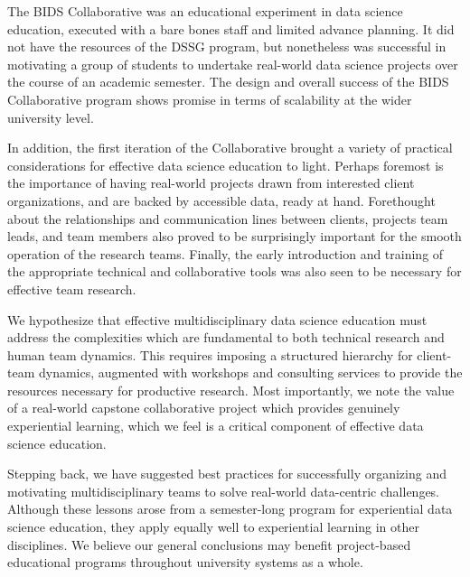 \documentclass[12pt]{article}
\begin{document}
The BIDS Collaborative was an educational experiment in data science education, executed with a bare bones staff and limited advance planning. It did not have the resources of the DSSG program, but nonetheless was successful in motivating a group of students to undertake real-world data science projects over the course of an academic semester.  The design and overall success of the BIDS Collaborative program shows promise in terms of scalability at the wider university level.

In addition, the first iteration of the Collaborative brought a variety of practical considerations for effective data science education to light.  Perhaps foremost is the importance of having real-world projects drawn from interested client organizations, and are backed by accessible data, ready at hand.  Forethought about the relationships and communication lines between clients, projects team leads, and team members also proved to be surprisingly important for the smooth operation of the research teams.  Finally, the early introduction and training of the appropriate technical and collaborative tools was also seen to be necessary for effective team research.

We hypothesize that effective multidisciplinary data science education must address the complexities which are fundamental to both technical research and human team dynamics. This requires imposing a structured hierarchy for client-team dynamics, augmented with workshops and consulting services to provide the resources necessary for productive research.  Most importantly, we note the value of a real-world capstone collaborative project which provides genuinely experiential learning, which we feel is a critical component of effective data science education.

Stepping back, we have suggested best practices for successfully organizing and motivating multidisciplinary teams to solve real-world data-centric challenges.  Although these lessons arose from a semester-long program for experiential data science education, they apply equally well to experiential learning in other disciplines.  We believe our general conclusions may benefit project-based educational programs throughout university systems as a whole.



\newpage

%
%

\newpage
\printbibliography
\end{document}
